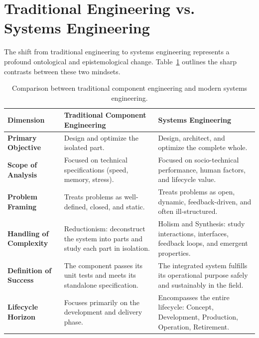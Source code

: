 \section{Traditional Engineering vs. Systems Engineering}
\label{sec:trad_vs_se}

The shift from traditional engineering to systems engineering represents a profound ontological and epistemological change. Table~\ref{tab:trad_vs_se} outlines the sharp contrasts between these two mindsets.

\begin{table}[htbp]
\centering
\small
\renewcommand{\arraystretch}{1.3}
\begin{tabularx}{\textwidth}{p{3.2cm}p{5.5cm}X}
\toprule
\textbf{Dimension} & \textbf{Traditional Component Engineering} & \textbf{Systems Engineering} \\
\midrule
\textbf{Primary Objective} & Design and optimize the isolated part. & Design, architect, and optimize the complete whole. \\
\textbf{Scope of Analysis} & Focused on technical specifications (speed, memory, stress). & Focused on socio-technical performance, human factors, and lifecycle value. \\
\textbf{Problem Framing} & Treats problems as well-defined, closed, and static. & Treats problems as open, dynamic, feedback-driven, and often ill-structured. \\
\textbf{Handling of Complexity} & Reductionism: deconstruct the system into parts and study each part in isolation. & Holism and Synthesis: study interactions, interfaces, feedback loops, and emergent properties. \\
\textbf{Definition of Success} & The component passes its unit tests and meets its standalone specification. & The integrated system fulfills its operational purpose safely and sustainably in the field. \\
\textbf{Lifecycle Horizon} & Focuses primarily on the development and delivery phase. & Encompasses the entire lifecycle: Concept, Development, Production, Operation, Retirement. \\
\bottomrule
\end{tabularx}
\caption{Comparison between traditional component engineering and modern systems engineering.}
\label{tab:trad_vs_se}
\end{table}

